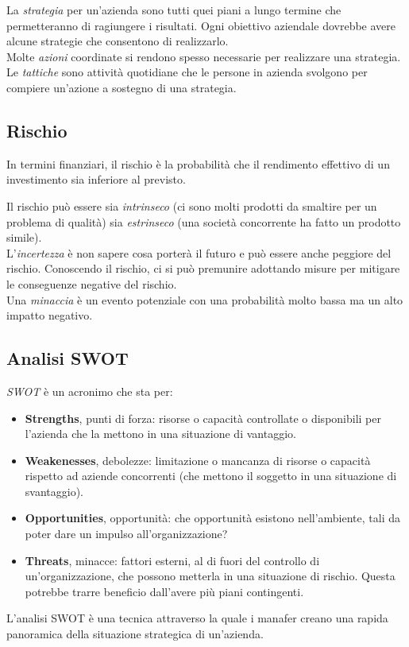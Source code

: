 \documentclass[a4paper,portrait,12pt]{article}
\theoremstyle{definition}
\begin{document}
La \emph{strategia} per un'azienda sono tutti quei piani a lungo termine che permetteranno di ragiungere i risultati.
Ogni obiettivo aziendale dovrebbe avere alcune strategie che consentono di realizzarlo.\\

Molte \emph{azioni} coordinate si rendono spesso necessarie per realizzare una strategia.\\

Le \emph{tattiche} sono attività quotidiane che le persone in azienda svolgono per compiere un'azione a sostegno di una strategia.

\subsection{Rischio}
In termini finanziari, il rischio è la probabilità che il rendimento effettivo di un investimento sia inferiore al previsto.

Il rischio può essere sia \emph{intrinseco} (ci sono molti prodotti da smaltire per un problema di qualità) sia \emph{estrinseco} (una società concorrente ha fatto un prodotto simile).\\

L'\emph{incertezza} è non sapere cosa porterà il futuro e può essere anche peggiore del rischio.
Conoscendo il rischio, ci si può premunire adottando misure per mitigare le conseguenze negative del rischio.\\

Una \emph{minaccia} è un evento potenziale con una probabilità molto bassa ma un alto impatto negativo.


\subsection{Analisi SWOT}

\emph{SWOT} è un acronimo che sta per:
\begin{itemize}
\item \textbf{Strengths}, punti di forza: risorse o capacità controllate o disponibili per l'azienda che la mettono in una situazione di vantaggio.
\item \textbf{Weakenesses}, debolezze: limitazione o mancanza di risorse o capacità rispetto ad aziende concorrenti (che mettono il soggetto in una situazione di svantaggio).
\item \textbf{Opportunities}, opportunità: che opportunità esistono nell'ambiente, tali da poter dare un impulso all'organizzazione?
\item \textbf{Threats}, minacce: fattori esterni, al di fuori del controllo di un'organizzazione, che possono metterla in una situazione di rischio.
Questa potrebbe trarre beneficio dall'avere più piani contingenti.
\end{itemize}
L'analisi SWOT è una tecnica attraverso la quale i manafer creano una rapida panoramica della situazione strategica di un'azienda.
\end{document}
